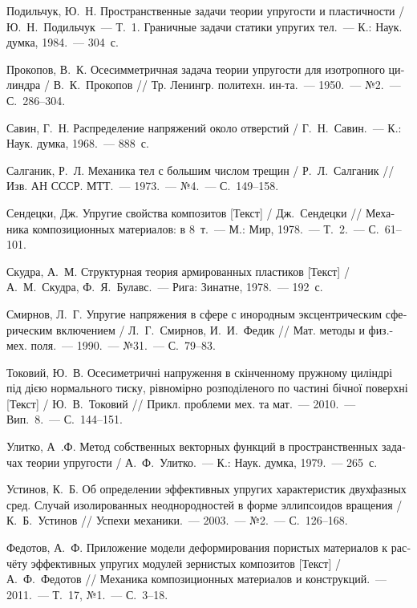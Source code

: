 \begin{russian}
\begin{biblist}{99}
Подильчук, Ю.~Н. 
Пространственные задачи теории упругости и пластичности 
/ Ю.~Н.~Подильчук~--- Т.~1. Граничные задачи статики упругих тел.~--- К.: Наук. думка, 1984.~--- 304~с.

Прокопов, В.~К. 
Осесимметричная задача теории упругости для изотропного цилиндра 
/ В.~К.~Прокопов 
// Тр. Ленингр. политехн. ин-та.~--- 1950.~--- №2.~--- С.~286--304.

Савин, Г.~Н. 
Распределение напряжений около отверстий 
/ Г.~Н.~Савин.~--- К.: Наук. думка, 1968.~--- 888~с.

Салганик, Р.~Л. 
Механика тел с большим числом трещин  
/ Р.~Л.~Салганик 
// Изв. АН СССР. МТТ.~--- 1973.~--- №4.~--- С.~149--158.

Сендецки, Дж. 
Упругие свойства композитов [Текст] 
/ Дж.~Сендецки 
// Механика композиционных материалов: в 8~т.~--- М.: Мир, 1978.~--- Т.~2.~--- С.~61--101.

Скудра, А.~М. 
Структурная теория армированных пластиков [Текст] 
/ А.~М.~Скудра, Ф.~Я.~Булавс.~--- Рига: Зинатне, 1978.~--- 192~с.

Смирнов, Л.~Г. 
Упругие напряжения в сфере с инородным эксцентрическим сферическим включением 
/ Л.~Г.~Смирнов,  И.~И.~Федик 
// Мат. методы и физ.-мех. поля.~--- 1990.~--- №31.~--- С.~79--83.


Токовий, Ю.~В. 
Осесиметричні напруження в скінченному пружному циліндрі під дією нормального тиску, рівномірно розподіленого по частині бічної поверхні [Текст] 
/ Ю.~В.~Токовий 
// Прикл. проблеми мех. та мат.~--- 2010.~--- Вип.~8.~--- С.~144--151.

Улитко, А~.Ф. 
Метод собственных векторных функций в пространственных задачах теории упругости 
/ А.~Ф.~Улитко.~--- К.: Наук. думка, 1979.~--- 265~с.

Устинов, К.~Б. 
Об определении эффективных упругих характеристик двухфазных сред. Случай изолированных неоднородностей в форме эллипсоидов вращения  
/ К.~Б.~Устинов 
// Успехи механики.~--- 2003.~--- №2.~--- С.~126--168.

Федотов, А.~Ф. 
Приложение модели деформирования пористых материалов к расчёту эффективных упругих модулей зернистых композитов [Текст] 
/ А.~Ф.~Федотов 
// Механика композиционных материалов и конструкций.~--- 2011.~--- Т.~17, №1.~--- С.~3--18.


\end{biblist}
\end{russian}
